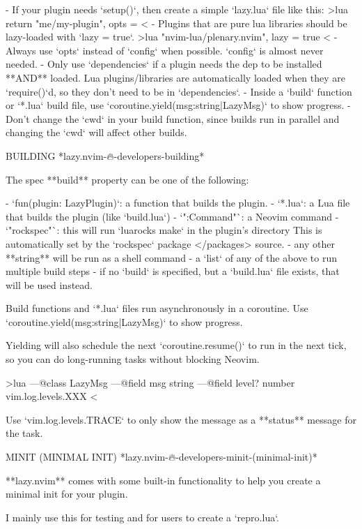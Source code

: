 \begin{listing}
- If your plugin needs `setup()`, then create a simple `lazy.lua` file like this:
    >lua
          return { "me/my-plugin", opts = {} }
    <
- Plugins that are pure lua libraries should be lazy-loaded with `lazy = true`.
    >lua
        { "nvim-lua/plenary.nvim", lazy = true }
    <
- Always use `opts` instead of `config` when possible. `config` is almost never
    needed.
- Only use `dependencies` if a plugin needs the dep to be installed **AND**
    loaded. Lua plugins/libraries are automatically loaded when they are
    `require()`d, so they don’t need to be in `dependencies`.
- Inside a `build` function or `*.lua` build file, use
    `coroutine.yield(msg:string|LazyMsg)` to show progress.
- Don’t change the `cwd` in your build function, since builds run in parallel
    and changing the `cwd` will affect other builds.


BUILDING                                  *lazy.nvim-🔥-developers-building*

The spec **build** property can be one of the following:

- `fun(plugin: LazyPlugin)`: a function that builds the plugin.
- `*.lua`: a Lua file that builds the plugin (like `build.lua`)
- `":Command"`: a Neovim command
- `"rockspec"`: this will run `luarocks make` in the plugin’s directory
    This is automatically set by the `rockspec` package </packages> source.
- any other **string** will be run as a shell command
- a `list` of any of the above to run multiple build steps
- if no `build` is specified, but a `build.lua` file exists, that will be used instead.

Build functions and `*.lua` files run asynchronously in a coroutine. Use
`coroutine.yield(msg:string|LazyMsg)` to show progress.

Yielding will also schedule the next `coroutine.resume()` to run in the next
tick, so you can do long-running tasks without blocking Neovim.

>lua
    ---@class LazyMsg
    ---@field msg string
    ---@field level? number vim.log.levels.XXX
<

Use `vim.log.levels.TRACE` to only show the message as a **status** message for
the task.



MINIT (MINIMAL INIT)          *lazy.nvim-🔥-developers-minit-(minimal-init)*

**lazy.nvim** comes with some built-in functionality to help you create a
minimal init for your plugin.

I mainly use this for testing and for users to create a `repro.lua`.


\end{listing}
